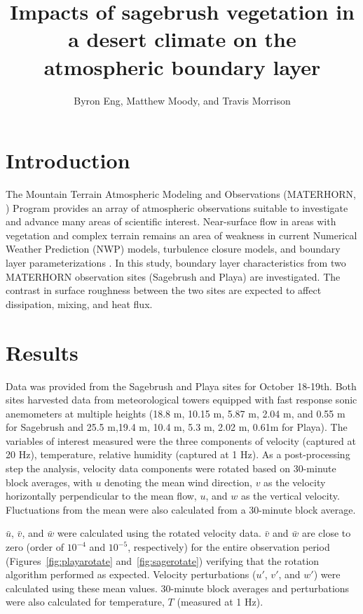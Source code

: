 \documentclass[]{article}
\title{Impacts of sagebrush vegetation in a desert climate on the atmospheric boundary layer}
\author{Byron Eng, Matthew Moody, and Travis Morrison}
\begin{document}
\maketitle


\section{Introduction}
The Mountain Terrain Atmospheric Modeling and Observations (MATERHORN, \citealt{MATERHORN}) Program provides an array of atmospheric observations suitable to investigate and advance many areas of scientific interest. Near-surface flow in areas with vegetation and complex terrain remains an area of weakness in current Numerical Weather Prediction (NWP) models, turbulence closure models, and boundary layer parameterizations \citep{MATERHORN}. In this study, boundary layer characteristics from two MATERHORN observation sites (Sagebrush and Playa) are investigated. The contrast in surface roughness between the two sites are expected to affect dissipation, mixing, and heat flux.

\section{Results}
Data was provided from the Sagebrush and Playa sites for October 18-19th. Both sites harvested data from meteorological towers equipped with fast response sonic anemometers at multiple heights (18.8 m, 10.15 m, 5.87 m, 2.04 m, and 0.55 m for Sagebrush and 25.5 m,19.4 m, 10.4 m, 5.3 m, 2.02 m, 0.61m for Playa). The variables of interest measured were the three components of velocity (captured at 20 Hz), temperature, relative humidity (captured at 1 Hz). As a post-processing step the analysis,  velocity data components were rotated based on 30-minute block averages, with $u$ denoting the mean wind direction, $v$ as the velocity horizontally perpendicular to the mean flow, $u$, and $w$ as the vertical velocity. Fluctuations from the mean were also calculated from a 30-minute block average. 

$\bar{u}$, $\bar{v}$, and $\bar{w}$ were calculated using the rotated velocity data. $\bar{v}$ and $\bar{w}$ are close to zero (order of $10^{-4}$ and $10^{-5}$, respectively) for the entire observation period (Figures~\ref{fig:playarotate} and~\ref{fig:sagerotate}) verifying that the rotation algorithm performed as expected. Velocity perturbations ($u'$, $v'$, and $w'$) were calculated using these mean values. 30-minute block averages and perturbations were also calculated for temperature, $T$ (measured at 1 Hz).
\end{document}
